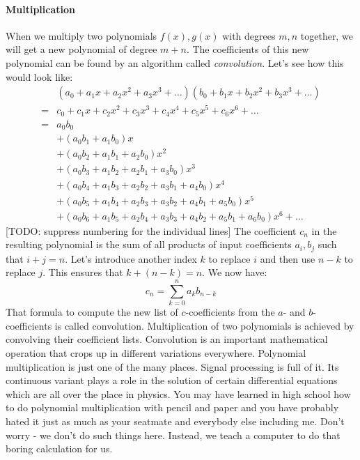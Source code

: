 \paragraph{Multiplication}
When we multiply two polynomials $f(x), g(x)$ with degrees $m,n$ together, we will get a new polynomial of degree $m+n$. The coefficients of this new polynomial can be found by an algorithm called \emph{convolution}. Let's see how this would look like:
\begin{eqnarray}
&  (a_0 + a_1 x + a_2 x^2 + a_3 x^3 + \ldots)
   (b_0 + b_1 x + b_2 x^2 + b_3 x^3 + \ldots)  \\
=&  c_0 + c_1 x + c_2 x^2 + c_3 x^3 + c_4 x^4 + c_5 x^5 + c_6 x^6 + \ldots \\
=&  a_0 b_0 \\
&+ (a_0 b_1 + a_1 b_0) x \\
&+ (a_0 b_2 + a_1 b_1 + a_2 b_0) x^2 \\
&+ (a_0 b_3 + a_1 b_2 + a_2 b_1 + a_3 b_0) x^3  \\
&+ (a_0 b_4 + a_1 b_3 + a_2 b_2 + a_3 b_1 + a_4 b_0) x^4 \\
&+ (a_0 b_5 + a_1 b_4 + a_2 b_3 + a_3 b_2 + a_4 b_1 + a_5 b_0) x^5 \\
&+ (a_0 b_6 + a_1 b_5 + a_2 b_4 + a_3 b_3 + a_4 b_2 + a_5 b_1 + a_6 b_0) x^6 + \ldots
\end{eqnarray}
[TODO: suppress numbering for the individual lines] \newline
The coefficient $c_n$ in the resulting polynomial is the sum of all products of input coefficients $a_i, b_j$ such that $i+j = n$. Let's introduce another index $k$ to replace $i$ and then use $n-k$ to replace $j$. This ensures that $k + (n-k) = n$. We now have:
\begin{equation}
  c_n = \sum_{k=0}^n a_k b_{n-k}
\end{equation}
That formula to compute the new list of $c$-coefficients from the $a$- and $b$-coefficients is called convolution. Multiplication of two polynomials is achieved by convolving their coefficient lists. Convolution is an important mathematical operation that crops up in different variations everywhere. Polynomial multiplication is just one of the many places. Signal processing is full of it. Its continuous variant plays a role in the solution of certain differential equations which are all over the place in physics. You may have learned in high school how to do polynomial multiplication with pencil and paper and you have probably hated it just as much as your seatmate and everybody else including me. Don't worry - we don't do such things here. Instead, we teach a computer to do that boring calculation for us.

